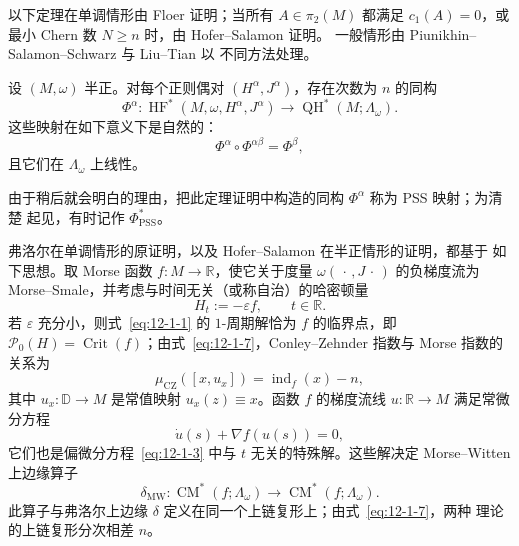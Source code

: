 以下定理在单调情形由 Floer  证明；当所有 $A\in\pi_2(M)$ 都满足
$c_1(A)=0$，或最小 Chern 数 $N\geq n$ 时，由 Hofer--Salamon  证明。
一般情形由 Piunikhin--Salamon--Schwarz  与 Liu--Tian  以
不同方法处理。

\begin{theorem}\label{thm:12-1-4}
设 $(M,\omega)$ 半正。对每个正则偶对 $(H^\alpha,J^\alpha)$，存在次数为 $n$ 的同构
\[
  \Phi^\alpha:\operatorname{HF}^*(M,\omega,H^\alpha,J^\alpha)
  \longrightarrow\operatorname{QH}^*(M;\Lambda_\omega).
\]
这些映射在如下意义下是自然的：
\[
  \Phi^\alpha\circ\Phi^{\alpha\beta}=\Phi^\beta,
\]
且它们在 $\Lambda_\omega$ 上线性。
\end{theorem}

由于稍后就会明白的理由，把此定理证明中构造的同构 $\Phi^\alpha$ 称为 PSS 映射；为清楚
起见，有时记作 $\Phi^*_{\mathrm{PSS}}$。

弗洛尔在单调情形的原证明，以及 Hofer--Salamon  在半正情形的证明，都基于
如下思想。取 Morse 函数 $f:M\to\mathbb R$，使它关于度量
$\omega(\,\cdot\,,J\,\cdot\,)$ 的负梯度流为 Morse--Smale，并考虑与时间无关（或称自治）的哈密顿量
\[
  H_t:=-\varepsilon f,\qquad t\in\mathbb R.
\]
若 $\varepsilon$ 充分小，则式~\eqref{eq:12-1-1} 的 $1$-周期解恰为 $f$ 的临界点，即
$\mathcal P_0(H)=\operatorname{Crit}(f)$；由式~\eqref{eq:12-1-7}，Conley--Zehnder 指数与
Morse 指数的关系为
\[
  \mu_{\mathrm{CZ}}([x,u_x])=\operatorname{ind}_f(x)-n,
\]
其中 $u_x:\mathbb D\to M$ 是常值映射 $u_x(z)\equiv x$。函数 $f$ 的梯度流线
$u:\mathbb R\to M$ 满足常微分方程
\begin{equation}\label{eq:12-1-12}
  \dot u(s)+\nabla f(u(s))=0,
\end{equation}
它们也是偏微分方程~\eqref{eq:12-1-3} 中与 $t$ 无关的特殊解。这些解决定
Morse--Witten 上边缘算子
\[
  \delta_{\mathrm{MW}}:\operatorname{CM}^*(f;\Lambda_\omega)
  \longrightarrow\operatorname{CM}^*(f;\Lambda_\omega).
\]
此算子与弗洛尔上边缘 $\delta$ 定义在同一个上链复形上；由式~\eqref{eq:12-1-7}，两种
理论的上链复形分次相差 $n$。

